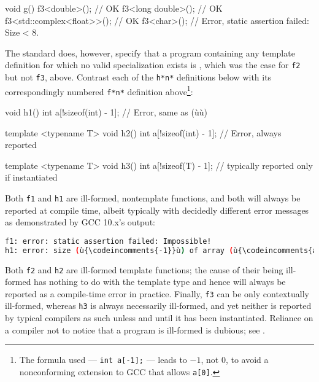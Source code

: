 \begin{emcppslisting}[emcppsbatch=e2]
void g()
{
    f3<double>();               // OK
    f3<long double>();          // OK
    f3<std::complex<float>>();  // OK
    f3<char>();                 // Error, static assertion failed: Size < 8.
}
\end{emcppslisting}

\noindent The standard does, however, specify that a program containing any
template definition for which no valid specialization exists is
, which was the case for
\lstinline!f2! but not \lstinline!f3!, above. Contrast each of the
\lstinline!h*!\lstinline[basicstyle=\ttfamily\itshape]!n!\lstinline!*! definitions below with its correspondingly numbered
\lstinline!f*!\lstinline[basicstyle=\ttfamily\itshape]!n!\lstinline!*!  definition above\footnote{The formula used --- \lstinline!int!~\lstinline!a[-1];! --- leads to $-1$, not $0$, to avoid a nonconforming extension to GCC that allows \lstinline!a[0]!.}:

\begin{emcppslisting}
void h1()
{
    int a[!sizeof(int) - 1];  // Error, same as (ù{}ù)
}

template <typename T>
void h2()
{
    int a[!sizeof(int) - 1];  // Error, always reported
}

template <typename T>
void h3()
{
    int a[!sizeof(T) - 1];    // typically reported only if instantiated
}
\end{emcppslisting}

\noindent Both \lstinline!f1! and \lstinline!h1! are ill-formed, nontemplate functions,
and both will always be reported at compile time, albeit typically with
decidedly different error messages as demonstrated by GCC 10.x's output:

\begin{lstlisting}[language=bash]
f1: error: static assertion failed: Impossible!
h1: error: size (ù{\codeincomments{-1}}ù) of array (ù{\codeincomments{a}}ù) is negative
\end{lstlisting}

\noindent Both \lstinline!f2! and \lstinline!h2! are ill-formed template functions; the cause of their being ill-formed has nothing to do with the
template type and hence will always be reported as a compile-time error
in practice. Finally, \lstinline!f3! can be only contextually ill-formed,
whereas \lstinline!h3! is always necessarily ill-formed, and yet neither is
reported by typical compilers as such unless and until it has been
instantiated. Reliance on a compiler not to notice that a program is
ill-formed is dubious; see
.

